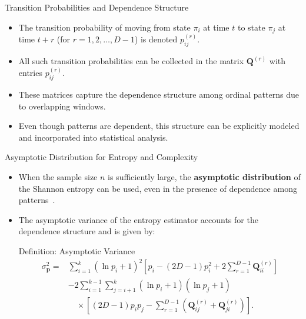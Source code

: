 \documentclass{beamer}
\begin{document}
\begin{frame}{Transition Probabilities and Dependence Structure}
	\begin{itemize}
		\item The transition probability of moving from state $\pi_i$ at time $t$ to state $\pi_j$ at time $t+r$ (for $r = 1, 2, \ldots, D-1$) is denoted $p^{(r)}_{ij}$.
		\item All such transition probabilities can be collected in the matrix $\mathbf{Q}^{(r)}$ with entries $p^{(r)}_{ij}$.
		\item These matrices capture the dependence structure among ordinal patterns due to overlapping windows.
		\item Even though patterns are dependent, this structure can be explicitly modeled and incorporated into statistical analysis.
	\end{itemize}
\end{frame}

\begin{frame}{Asymptotic Distribution for Entropy and Complexity}
	\begin{itemize}
		\item When the sample size $n$ is sufficiently large, the \textbf{asymptotic distribution} of the Shannon entropy can be used, even in the presence of dependence among patterns~\cite{Rey2023a}.
		\item The asymptotic variance of the entropy estimator accounts for the dependence structure and is given by:
	\begin{block}{Definition: Asymptotic Variance}
		\[
			\begin{split}
				\sigma^2_{\mathbf{p}} = & \sum_{i=1}^{k}(\ln p_i + 1)^2 
				\left[ p_i - (2D - 1)p_i^2 + 2\sum_{r=1}^{D-1} \mathbf{Q}^{(r)}_{ii} \right] \\
				& - 2 \sum_{i=1}^{k-1} \sum_{j=i+1}^{k} (\ln p_i + 1)(\ln p_j + 1) \\
				& \quad \times \left[ (2D - 1)p_i p_j - \sum_{r=1}^{D-1} \left( \mathbf{Q}^{(r)}_{ij} + \mathbf{Q}^{(r)}_{ji} \right) \right].
			\end{split}
			\]
	\end{block}
	\end{itemize}
\end{frame}
\end{document}
